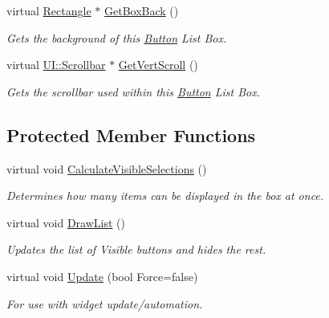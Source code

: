 \begin{DoxyCompactItemize}
virtual \hyperlink{classphys_1_1UI_1_1Rectangle}{Rectangle} $\ast$ \hyperlink{classphys_1_1UI_1_1ButtonListBox_a043ce9d76af4538043551bf508811b12}{GetBoxBack} ()
\begin{DoxyCompactList}\small\item\em Gets the background of this \hyperlink{classphys_1_1UI_1_1Button}{Button} List Box. \item\end{DoxyCompactList}\item 
virtual \hyperlink{classphys_1_1UI_1_1Scrollbar}{UI::Scrollbar} $\ast$ \hyperlink{classphys_1_1UI_1_1ButtonListBox_ad0988e4abe0daef3b9949e42c6dfc5fd}{GetVertScroll} ()
\begin{DoxyCompactList}\small\item\em Gets the scrollbar used within this \hyperlink{classphys_1_1UI_1_1Button}{Button} List Box. \item\end{DoxyCompactList}\end{DoxyCompactItemize}
\subsection*{Protected Member Functions}
\begin{DoxyCompactItemize}
\item 
\hypertarget{classphys_1_1UI_1_1ButtonListBox_a1b8d7f3de8e241c940f022ea5b5e1c97}{
virtual void \hyperlink{classphys_1_1UI_1_1ButtonListBox_a1b8d7f3de8e241c940f022ea5b5e1c97}{CalculateVisibleSelections} ()}
\label{d4/dd7/classphys_1_1UI_1_1ButtonListBox_a1b8d7f3de8e241c940f022ea5b5e1c97}

\begin{DoxyCompactList}\small\item\em Determines how many items can be displayed in the box at once. \item\end{DoxyCompactList}\item 
\hypertarget{classphys_1_1UI_1_1ButtonListBox_a6fbb3046819a0dace3a178a752efe652}{
virtual void \hyperlink{classphys_1_1UI_1_1ButtonListBox_a6fbb3046819a0dace3a178a752efe652}{DrawList} ()}
\label{d4/dd7/classphys_1_1UI_1_1ButtonListBox_a6fbb3046819a0dace3a178a752efe652}

\begin{DoxyCompactList}\small\item\em Updates the list of Visible buttons and hides the rest. \item\end{DoxyCompactList}\item 
\hypertarget{classphys_1_1UI_1_1ButtonListBox_a4c412be3030aea2e3ca2ce946a4cdd26}{
virtual void \hyperlink{classphys_1_1UI_1_1ButtonListBox_a4c412be3030aea2e3ca2ce946a4cdd26}{Update} (bool Force=false)}
\label{d4/dd7/classphys_1_1UI_1_1ButtonListBox_a4c412be3030aea2e3ca2ce946a4cdd26}

\begin{DoxyCompactList}\small\item\em For use with widget update/automation. \item\end{DoxyCompactList}\end{DoxyCompactItemize}
